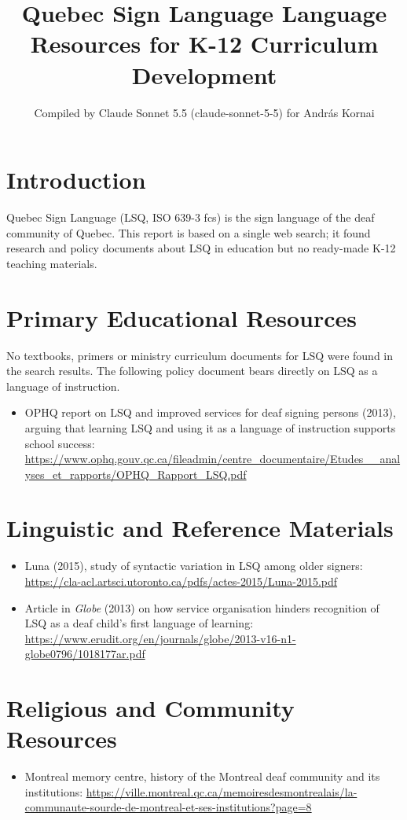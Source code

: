 \documentclass[12pt]{article}
\title{Quebec Sign Language Language Resources for K-12 Curriculum Development}
\author{Compiled by Claude Sonnet 5.5 (claude-sonnet-5-5) for Andr\'as Kornai}
\date{}
\begin{document}
\maketitle
\section{Introduction}
Quebec Sign Language (LSQ, ISO 639-3 fcs) is the sign language of the deaf community of Quebec. This report is based on a single web search; it found research and policy documents about LSQ in education but no ready-made K-12 teaching materials.
\section{Primary Educational Resources}
No textbooks, primers or ministry curriculum documents for LSQ were found in the search results. The following policy document bears directly on LSQ as a language of instruction.
\begin{itemize}
\item OPHQ report on LSQ and improved services for deaf signing persons (2013), arguing that learning LSQ and using it as a language of instruction supports school success: \url{https://www.ophq.gouv.qc.ca/fileadmin/centre_documentaire/Etudes__analyses_et_rapports/OPHQ_Rapport_LSQ.pdf}
\end{itemize}
\section{Linguistic and Reference Materials}
\begin{itemize}
\item Luna (2015), study of syntactic variation in LSQ among older signers: \url{https://cla-acl.artsci.utoronto.ca/pdfs/actes-2015/Luna-2015.pdf}
\item Article in \textit{Globe} (2013) on how service organisation hinders recognition of LSQ as a deaf child's first language of learning: \url{https://www.erudit.org/en/journals/globe/2013-v16-n1-globe0796/1018177ar.pdf}
\end{itemize}
\section{Religious and Community Resources}
\begin{itemize}
\item Montreal memory centre, history of the Montreal deaf community and its institutions: \url{https://ville.montreal.qc.ca/memoiresdesmontrealais/la-communaute-sourde-de-montreal-et-ses-institutions?page=8}
\end{itemize}
\end{document}

